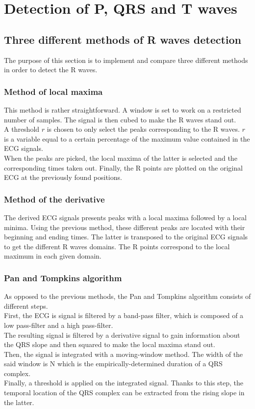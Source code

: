 \documentclass[11pt]{report}
\begin{document}
\chapter{Detection of P, QRS and T waves}
	\section{Three different methods of R waves detection}
		The purpose of this section is to implement and compare three different methods in order to detect the R waves.
		\subsection{Method of local maxima}
			This method is rather straightforward. A window is set to work on a restricted number of samples. The signal is then cubed to make the R waves stand out.\\
			A threshold $r$ is chosen to only select the peaks corresponding to the R waves. $r$ is a variable equal to a certain percentage of the maximum value contained in the ECG signals.\\
			When the peaks are picked, the local maxima of the latter is selected and the corresponding times taken out. Finally, the R points are plotted on the original ECG at the previously found positions.
		\subsection{Method of the derivative}
			The derived ECG signals presents peaks with a local maxima followed by a local minima. Using the previous method, these different peaks are located with their beginning and ending times. The latter is transposed to the original ECG signals to get the different R waves domains. The R points correspond to the local maximum in each given domain.
		\subsection{Pan and Tompkins algorithm}
			As opposed to the previous methods, the Pan and Tompkins algorithm consists of different steps.\\
			First, the ECG is signal is filtered by a band-pass filter, which is composed of a low pass-filter and a high pass-filter.\\
			The resulting signal is filtered by a derivative signal to gain information about the QRS slope and then squared to make the local maxima stand out.\\
			Then, the signal is integrated with a moving-window method. The width of the said window is N which is the empirically-determined duration of a QRS complex.\\
			Finally, a threshold is applied on the integrated signal. Thanks to this step, the temporal location of the QRS complex can be extracted from the rising slope in the latter.
\end{document}
